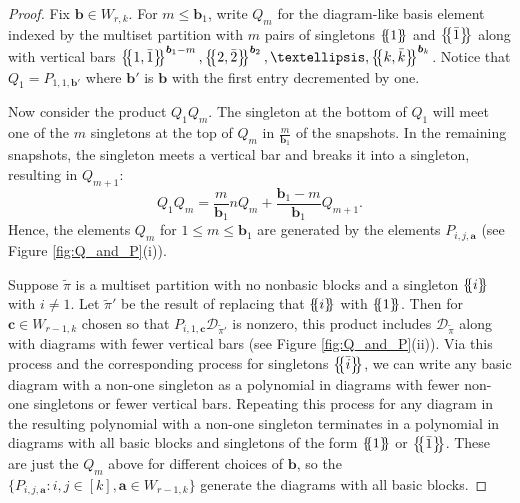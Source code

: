 \documentclass[10pt]{amsart}
\theoremstyle{definition}
\theoremstyle{definition}
\theoremstyle{plain}
\theoremstyle{remark}
\theoremstyle{plain}
\theoremstyle{plain}
\newcommand{\DD}{\mathcal{D}}
\newcommand{\bfa}{{\boldsymbol{a}}}
\newcommand{\bfb}{{\boldsymbol{b}}}
\newcommand{\bfc}{{\boldsymbol{c}}}
\newcommand{\tpi}{{\tilde{\pi}}}
\newcommand{\multi}[1]{\left\{\mskip-5mu\left\{#1\right\}\mskip-5mu\right\}}
\newcommand{\ov}[1]{\bar{#1}}
\begin{document}
\begin{proof}
    Fix $\bfb\in W_{r,k}$. For $m\leq\bfb_1$, write $Q_m$ for the diagram-like basis element indexed by the multiset partition with $m$ pairs of singletons $\multi{1}$ and $\multi{\ov1}$ along with vertical bars $\multi{1,\ov1}^{\bfb_1-m},\multi{2,\ov2}^{\bfb_2},\dots,\multi{k,\ov k}^{\bfb_k}$. Notice that $Q_1=P_{1,1,\bfb'}$ where $\bfb'$ is $\bfb$ with the first entry decremented by one.

    Now consider the product $Q_1Q_m$. The singleton at the bottom of $Q_1$ will meet one of the $m$ singletons at the top of $Q_m$ in $\frac{m}{\bfb_1}$ of the snapshots. In the remaining snapshots, the singleton meets a vertical bar and breaks it into a singleton, resulting in $Q_{m+1}$: \[Q_1Q_m=\frac{m}{\bfb_1}nQ_m+\frac{\bfb_1-m}{\bfb_1}Q_{m+1}.\] Hence, the elements $Q_m$ for $1\leq m\leq \bfb_1$ are generated by the elements $P_{i,j,\bfa}$ (see Figure \ref{fig:Q_and_P}(i)).

    Suppose $\tpi$ is a multiset partition with no nonbasic blocks and a singleton $\multi{i}$ with $i\neq 1$. Let $\tpi'$ be the result of replacing that $\multi{i}$ with $\multi{1}$. Then for $\bfc\in W_{r-1,k}$ chosen so that $P_{i,1,\bfc}\DD_{\tpi'}$ is nonzero, this product includes $\DD_\tpi$ along with diagrams with fewer vertical bars (see Figure \ref{fig:Q_and_P}(ii)). Via this process and the corresponding process for singletons $\multi{\ov i}$, we can write any basic diagram with a non-one singleton as a polynomial in diagrams with fewer non-one singletons or fewer vertical bars. Repeating this process for any diagram in the resulting polynomial with a non-one singleton terminates in a polynomial in diagrams with all basic blocks and singletons of the form $\multi{1}$ or $\multi{\ov 1}$. These are just the $Q_m$ above for different choices of $\bfb$, so the $\{P_{i,j,\bfa}:i,j\in[k],\bfa\in W_{r-1,k}\}$ generate the diagrams with all basic blocks.
\end{proof}
\end{document}
